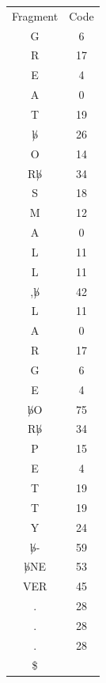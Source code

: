 \documentclass{article}[12pt]
\begin{document}
\begin{tabular}{|c|c|}
  \hline
  Fragment & Code \\
  G & 6 \\
  R & 17 \\
  E & 4 \\
  A & 0 \\
  T & 19 \\
  $\not b$ & 26 \\
  O & 14 \\
  R$\not b$ & 34 \\
  S & 18 \\
  M & 12 \\
  A & 0 \\
  L & 11 \\
  L & 11 \\
  ,$\not b$ & 42 \\
  L & 11 \\
  A & 0 \\
  R & 17 \\
  G & 6 \\
  E & 4 \\
  $\not b$O & 75 \\
  R$\not b$ & 34 \\
  P & 15 \\
  E & 4 \\
  T & 19 \\
  T & 19 \\
  Y & 24 \\
  $\not b$- & 59 \\
  $\not b$NE & 53 \\
  VER & 45 \\
  . & 28 \\
  . & 28 \\
  . & 28 \\
  \$ & \\
  \hline
\end{tabular}
\end{document}

